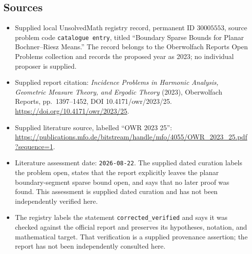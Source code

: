 \documentclass[11pt]{article}
\begin{document}
\subsection{Sources}
\begin{itemize}
\item Supplied local UnsolvedMath registry record, permanent ID \(30005553\), source problem code \texttt{catalogue entry}, titled ``Boundary Sparse Bounds for Planar Bochner--Riesz Means.'' The record belongs to the Oberwolfach Reports Open Problems collection and records the proposed year as 2023; no individual proposer is supplied.
\item Supplied report citation: \emph{Incidence Problems in Harmonic Analysis, Geometric Measure Theory, and Ergodic Theory} (2023), Oberwolfach Reports, pp.\ 1397--1452, DOI 10.4171/owr/2023/25. \url{https://doi.org/10.4171/owr/2023/25}.
\item Supplied literature source, labelled ``OWR 2023 25'': \url{https://publications.mfo.de/bitstream/handle/mfo/4055/OWR_2023_25.pdf?sequence=1}.
\item Literature assessment date: \texttt{2026-08-22}. The supplied dated curation labels the problem open, states that the report explicitly leaves the planar boundary-segment sparse bound open, and says that no later proof was found. This assessment is supplied dated curation and has not been independently verified here.
\item The registry labels the statement \texttt{corrected\_verified} and says it was checked against the official report and preserves its hypotheses, notation, and mathematical target. That verification is a supplied provenance assertion; the report has not been independently consulted here.
\end{itemize}
\end{document}
